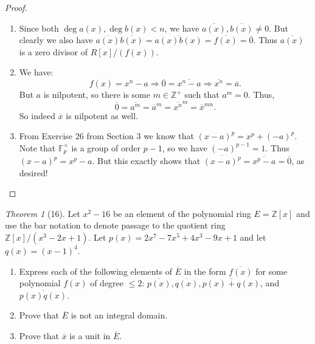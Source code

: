 \documentclass[12pt]{article}
\theoremstyle{remark}
\theoremstyle{named}
\newtheorem*{theorem}{Theorem}
\newcommand{\Z}{\mathbb Z}
\newcommand{\F}{\mathbb F}
\begin{document}
\begin{proof}
\begin{enumerate}
        \item Since both \(\deg a(x), \deg b(x) < n\), we have \(\overline{a(x)}, \overline{b(x)} \neq 0\). But clearly we also have \(\overline{a(x)}\overline{b(x)} = \overline{a(x)b(x)} = \overline{f(x)} = \overline{0}\). Thus \(\overline{a(x)}\) is a zero divisor of \(R[x]/(f(x))\).
        \item We have: \[f(x) = x^n - a \Rightarrow \overline{0} = \overline{x^n - a} \Rightarrow \overline{x^n} = \overline{a}.\]
        But \(a\) is nilpotent, so there is some \(m \in \Z^+\) such that \(a^m = 0\). Thus, \[\overline{0} = \overline{a^m} = \overline{a}^m = \overline{x^n}^m = \overline{x}^{mn}.\]
        So indeed \(\overline{x}\) is nilpotent as well.
        \item From Exercise 26 from Section 3 we know that \((x - a)^p = x^p + (-a)^p\). Note that \(\F_p^\times\) is a group of order \(p - 1\), so we have \((-a)^{p - 1} = 1\). Thus \((x - a)^p = x^p - a\). But this exactly shows that \(\overline{(x - a)^p} = \overline{x^p - a} = \overline{0}\), as desired!
    \end{enumerate}
\end{proof}

\begin{theorem}[16]
    Let \(x^2 - 16\) be an element of the polynomial ring \(E = \Z[x]\) and use the bar notation to denote passage to the quotient ring \(\Z[x]/(x^3 - 2x + 1)\). Let \(p(x) = 2x^7 - 7x^5 + 4x^3 - 9x + 1\) and let \(q(x) = (x - 1)^4\).
    \begin{enumerate}
        \item Express each of the following elements of \(\overline{E}\) in the form \(\overline{f(x)}\) for some polynomial \(f(x)\) of degree \(\le 2\): \(\overline{p(x)}, \overline{q(x)}, \overline{p(x) + q(x)}\), and \(\overline{p(x)q(x)}\).
        \item Prove that \(\overline{E}\) is not an integral domain.
        \item Prove that \(\overline{x}\) is a unit in \(\overline{E}\).
    \end{enumerate}
\end{theorem}
\end{document}
